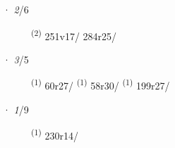 \noindent{} · \textit{2}/6 \LEMMALINE
\begin{description}
    \item[]  \textsuperscript{(2)} \mbox{251v17/} \mbox{284r25/}
\end{description}
\ENTRYEND
\noindent{} · \textit{3}/5 \LEMMALINE
\begin{description}
    \item[]  \textsuperscript{(1)} \mbox{60r27/} \CASEBREAK {} \textsuperscript{(1)} \mbox{58r30/} \textsuperscript{(1)} \mbox{199r27/}
\end{description}
\ENTRYEND
\noindent{} · \textit{1}/9 \LEMMALINE
\begin{description}
    \item[]  \textsuperscript{(1)} \mbox{230r14/}
\end{description}
\ENTRYEND
